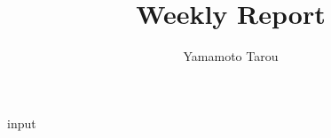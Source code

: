 \documentclass[11pt,a4paper,twocolumn]{jarticle}
\title {Weekly Report}
\author {Yamamoto Tarou}
\begin{document}
\maketitle
 {input}
\end{document}
